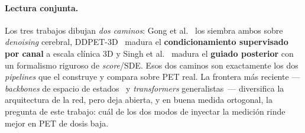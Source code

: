 \paragraph{Lectura conjunta.} Los tres trabajos dibujan \emph{dos
caminos}: Gong et al.~\cite{ddpmpet2023} los siembra ambos sobre
\textit{denoising} cerebral, DDPET-3D~\cite{ddpet3d} madura el
\textbf{condicionamiento supervisado por canal} a escala clínica 3D y
Singh et al.~\cite{scorepet2024} madura el \textbf{guiado posterior}
con un formalismo riguroso de \textit{score}/SDE. Esos dos caminos son
exactamente los dos \textit{pipelines} que el  construye
y compara sobre PET real. La frontera más reciente ---\textit{backbones}
de espacio de estados~\cite{mamba2025} y \textit{transformers}
generalistas~\cite{tat2025}--- diversifica la arquitectura de la red,
pero deja abierta, y en buena medida ortogonal, la pregunta de este
trabajo: cuál de los dos modos de inyectar la medición rinde mejor en
PET de dosis baja.
